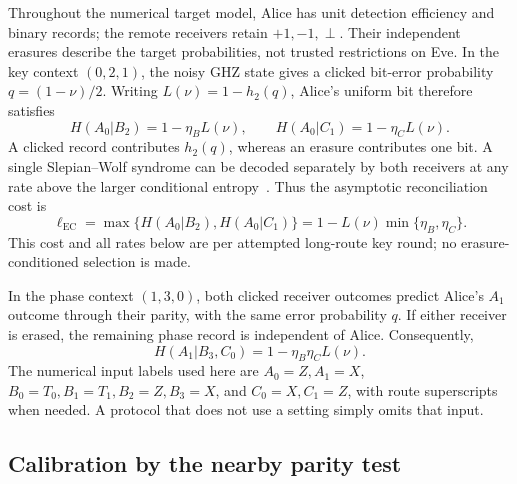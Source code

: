 \documentclass[aps,10pt,onecolumn,prx,superscriptaddress,longbibliography,nofootinbib]{revtex4-2}
\newcommand{\hbin}{h_2}
\newcommand{\EC}{\ell_{\mathrm{EC}}}
\newcommand{\perpout}{\perp}
\begin{document}
Throughout the numerical target model, Alice has unit detection efficiency and binary records; the remote receivers retain \(+1,-1,\perpout\). Their independent erasures describe the target probabilities, not trusted restrictions on Eve. In the key context \((0,2,1)\), the noisy GHZ state gives a clicked bit-error probability \(q=(1-\nu)/2\). Writing \(L(\nu)=1-\hbin(q)\), Alice's uniform bit therefore satisfies
\begin{equation}
 H(A_0|B_2)=1-\eta_B L(\nu),\qquad
 H(A_0|C_1)=1-\eta_C L(\nu).
 \label{eq:si-ternary-key-entropies}
\end{equation}
A clicked record contributes \(\hbin(q)\), whereas an erasure contributes one bit. A single Slepian--Wolf syndrome can be decoded separately by both receivers at any rate above the larger conditional entropy~\cite{SlepianWolf1973}. Thus the asymptotic reconciliation cost is
\begin{equation}
 \EC=\max\{H(A_0|B_2),H(A_0|C_1)\}
 =1-L(\nu)\min\{\eta_B,\eta_C\}.
 \label{eq:si-ternary-ec}
\end{equation}
This cost and all rates below are per attempted long-route key round; no erasure-conditioned selection is made.

In the phase context \((1,3,0)\), both clicked receiver outcomes predict Alice's \(A_1\) outcome through their parity, with the same error probability \(q\). If either receiver is erased, the remaining phase record is independent of Alice. Consequently,
\begin{equation}
 H(A_1|B_3,C_0)=1-\eta_B\eta_C L(\nu).
 \label{eq:si-phase-entropy}
\end{equation}
The numerical input labels used here are \(A_0=Z,A_1=X\), \(B_0=T_0,B_1=T_1,B_2=Z,B_3=X\), and \(C_0=X,C_1=Z\), with route superscripts when needed. A protocol that does not use a setting simply omits that input.

\subsection{Calibration by the nearby parity test}
\end{document}
